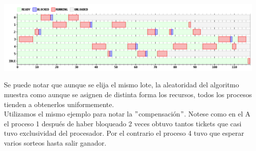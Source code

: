 \begin {center}
\includegraphics[width=16cm]{../simusched/outputs/loteryf.png}
\end {center}



Se puede notar que aunque se elija el mismo lote, la aleatoridad del algoritmo muestra como aunque se asignen de distinta forma los recursos, todos los procesos
tienden a obtenerlos uniformemente.\\
Utilizamos el mismo ejemplo para notar la $"$compensación$"$. Notese como en el A el proceso 1 después de haber bloqueado 2 veces obtuvo tantos tickets que casi tuvo
exclusividad del procesador. Por el contrario el proceso 4 tuvo que esperar varios sorteos hasta salir ganador.
